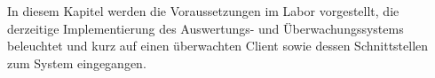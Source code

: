 \label{chap_text:Analyse}
In diesem Kapitel werden die Voraussetzungen im Labor vorgestellt, die derzeitige Implementierung des Auswertungs- und Überwachungssystems beleuchtet und kurz auf einen überwachten Client sowie dessen Schnittstellen zum System eingegangen.